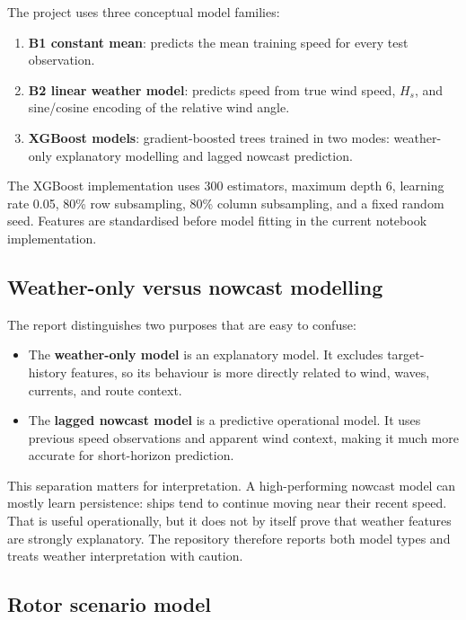 \documentclass[10pt,a4paper]{article}
\newcommand{\hs}{$H_s$}
\begin{document}
The project uses three conceptual model families:

\begin{enumerate}
    \item \textbf{B1 constant mean}: predicts the mean training speed for every
    test observation.
    \item \textbf{B2 linear weather model}: predicts speed from true wind speed,
    \hs{}, and sine/cosine encoding of the relative wind angle.
    \item \textbf{XGBoost models}: gradient-boosted trees trained in two modes:
    weather-only explanatory modelling and lagged nowcast prediction.
\end{enumerate}

The XGBoost implementation uses 300 estimators, maximum depth 6, learning rate
0.05, 80\% row subsampling, 80\% column subsampling, and a fixed random seed.
Features are standardised before model fitting in the current notebook
implementation.

\subsection{Weather-only versus nowcast modelling}

The report distinguishes two purposes that are easy to confuse:

\begin{itemize}
    \item The \textbf{weather-only model} is an explanatory model. It excludes
    target-history features, so its behaviour is more directly related to
    wind, waves, currents, and route context.
    \item The \textbf{lagged nowcast model} is a predictive operational model.
    It uses previous speed observations and apparent wind context, making it
    much more accurate for short-horizon prediction.
\end{itemize}

This separation matters for interpretation. A high-performing nowcast model can
mostly learn persistence: ships tend to continue moving near their recent speed.
That is useful operationally, but it does not by itself prove that weather
features are strongly explanatory. The repository therefore reports both model
types and treats weather interpretation with caution.

\subsection{Rotor scenario model}
\end{document}
